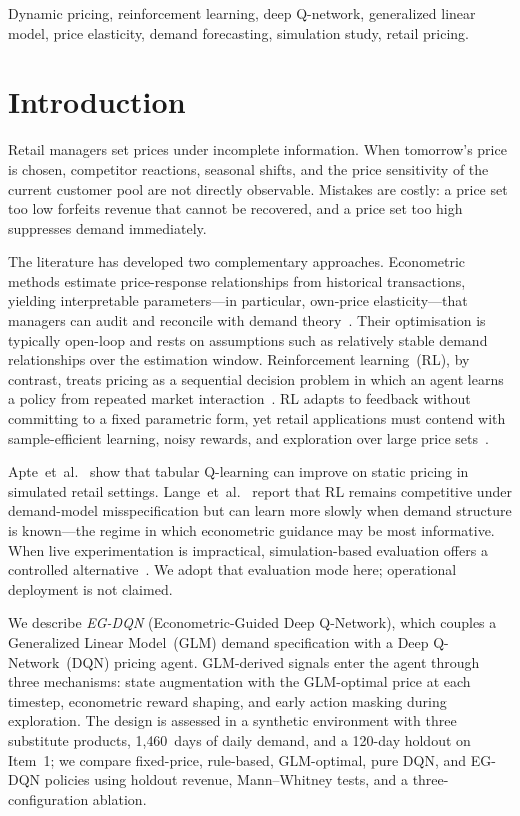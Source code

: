 \documentclass[journal, 10pt, twoside]{IEEEtran}
\begin{document}
\begin{IEEEkeywords}
Dynamic pricing, reinforcement learning, deep Q-network, generalized linear
model, price elasticity, demand forecasting, simulation study, retail
pricing.
\end{IEEEkeywords}

\section{Introduction}
\label{sec:intro}

Retail managers set prices under incomplete information.
When tomorrow's price is chosen, competitor reactions, seasonal
shifts, and the price sensitivity of the current customer pool
are not directly observable.
Mistakes are costly: a price set too low forfeits revenue that
cannot be recovered, and a price set too high suppresses demand
immediately.

The literature has developed two complementary approaches.
Econometric methods estimate price-response relationships from
historical transactions, yielding interpretable parameters---in
particular, own-price elasticity---that managers can audit and reconcile with
demand theory~\cite{kopalle2023}.
Their optimisation is typically open-loop and rests on assumptions
such as relatively stable demand relationships over the estimation
window.
Reinforcement learning~(RL), by contrast, treats pricing as a
sequential decision problem in which an agent learns a policy from
repeated market interaction~\cite{lange2025}.
RL adapts to feedback without committing to a fixed parametric form,
yet retail applications must contend with sample-efficient learning,
noisy rewards, and exploration over large price sets~\cite{apte2024,
cheung2023}.

Apte~et~al.~\cite{apte2024} show that tabular Q-learning can improve
on static pricing in simulated retail settings.
Lange~et~al.~\cite{lange2025} report that RL remains
competitive under demand-model misspecification but can learn more
slowly when demand structure is known---the regime in which
econometric guidance may be most informative.
When live experimentation is impractical, simulation-based evaluation
offers a controlled alternative~\cite{nambiar2022, chen2023}.
We adopt that evaluation mode here; operational deployment is not
claimed.

We describe \textit{EG-DQN} (Econometric-Guided Deep Q-Network),
which couples a Generalized Linear Model~(GLM) demand specification
with a Deep Q-Network~(DQN) pricing agent.
GLM-derived signals enter the agent through three mechanisms:
state augmentation with the GLM-optimal price at each timestep,
econometric reward shaping, and early action masking during
exploration.
The design is assessed in a synthetic environment with three
substitute products, 1{,}460~days of daily demand, and a 120-day
holdout on Item~1; we compare fixed-price, rule-based, GLM-optimal,
pure DQN, and EG-DQN policies using holdout revenue, Mann--Whitney
tests, and a three-configuration ablation.
\end{document}
